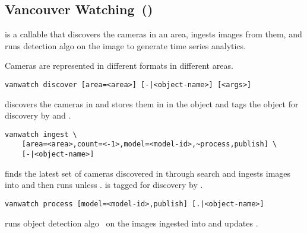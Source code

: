 \subsection{Vancouver Watching~()}\label{vanwatch}

 is a callable that discovers the cameras in an area, ingests images from them, and runs detection algo on the image to generate time series analytics.

Cameras are represented in different formats in different areas.
%
\begin{verbatim}
vanwatch discover [area=<area>] [-|<object-name>] [<args>]
\end{verbatim}
%
discovers the cameras in  and stores them in  in the object  and tags the object for discovery by  and . 

\begin{verbatim}
vanwatch ingest \
    [area=<area>,count=<-1>,model=<model-id>,~process,publish] \
    [-|<object-name>]
\end{verbatim}
%
finds the latest set of cameras discovered in  through  search and ingests  images into  and then runs  unless .  is tagged for discovery by . 

\marginpar{\keyword{process}}
\begin{verbatim}
vanwatch process [model=<model-id>,publish] [.|<object-name>]
\end{verbatim}
%
runs object detection algo~\cite{ultralytics} on the images ingested into  and updates .